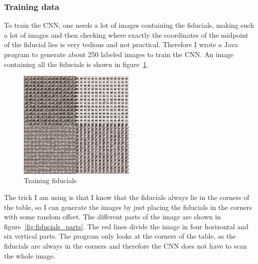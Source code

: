 \subsubsection{Training data}\label{subsubsec:training-data}
To train the CNN, one needs a lot of images containing the fiducials, making such a lot of images and then checking where exactly the coordinates of the midpoint of the fiducial lies is very tedious and not practical.
Therefore I wrote a Java program to generate about 250 labeled images to train the CNN.
An image containing all the fiducials is shown in figure~\ref{fig:fiducials}.
\begin{figure}[H]
    \centering
    \includegraphics[width=0.5\textwidth]{../photos/training_whole_general_image}
    \caption[fiducials]{Training fiducials}
    \label{fig:fiducials}
\end{figure}
The trick I am using is that I know that the fiducials always lie in the corners of the table, so I can generate the images by just placing the fiducials in the corners with some random offset.
The different parts of the image are shown in figure~\ref{fig:fiducials_parts}.
The red lines divide the image in four horizontal and six vertical parts.
The program only looks at the corners of the table, as the fiducials are always in the corners and therefore the CNN does not have to scan the whole image.

